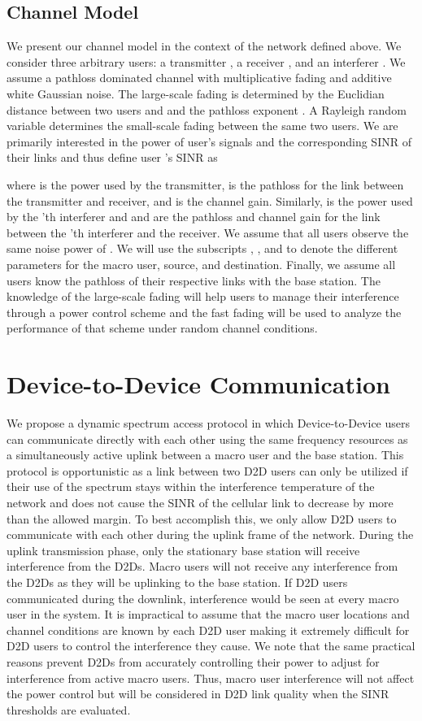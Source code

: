 \documentclass[10pt, final, journal, letterpaper,oneside, twocolumn]{IEEEtran}
\begin{document}
\subsection{Channel Model}

We present our channel model in the context of the network defined above.  We consider three arbitrary users: a transmitter , a receiver , and an interferer .  We assume a pathloss dominated channel with multiplicative fading and additive white Gaussian noise.  The large-scale fading is determined by the Euclidian distance  between two users  and  and the pathloss exponent .  A Rayleigh random variable  determines the small-scale fading between the same two users. We are primarily interested in the power of user's signals and the corresponding SINR of their links and thus define user 's SINR as

where  is the power used by the transmitter,  is the pathloss for the link between the transmitter and receiver, and  is the channel gain.  Similarly,  is the power used by the 'th interferer and  and  are the pathloss and channel gain for the link between the 'th interferer and the receiver.  We assume that all users observe the same noise power of .  We will use the subscripts , , and  to denote the different parameters for the macro user, source, and destination.  Finally, we assume all users know the pathloss of their respective links with the base station.  The knowledge of the large-scale fading will help users to manage their interference through a power control scheme and the fast fading will be used to analyze the performance of that scheme under random channel conditions.  
\section{Device-to-Device Communication}
\label{sec:discovery}
We propose a dynamic spectrum access protocol in which Device-to-Device users can communicate directly with each other using the same frequency resources as a simultaneously active uplink between a macro user and the base station.  This protocol is opportunistic as a link between two D2D users can only be utilized if their use of the spectrum  stays within the interference temperature of the network and does not cause the SINR of the cellular link to decrease by more than the allowed margin.  To best accomplish this, we only allow D2D users to communicate with each other during the uplink frame of the network.  During the uplink transmission phase, only the stationary base station will receive interference from the D2Ds.  Macro users will not receive any interference from the D2Ds as they will be uplinking to the base station.  If D2D users communicated during the downlink, interference would be seen at every macro user in the system.  It is impractical to assume that the macro user locations and channel conditions are known by each D2D user making it extremely difficult for D2D users to control the interference they cause.  We note that the same practical reasons prevent D2Ds from accurately controlling their power to adjust for interference from active macro users.  Thus, macro user interference will not affect the power control but will be considered in D2D link quality when the SINR thresholds are evaluated.  
\end{document}
